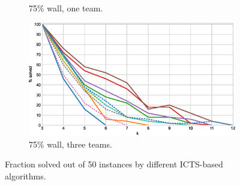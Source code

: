 \documentclass[english]{article}
\newcommand\graphwidth{0.49\textwidth}
\begin{document}
\begin{figure}[t]
\begin{subfigure}{\graphwidth}
			\caption{75\% wall, one team.}
			\label{fig:i-75-1-p}
		\end{subfigure}
		\begin{subfigure}{\graphwidth}
			\centering
			\includegraphics[width=\linewidth]{img/results/icts-comparison/75-3-p}
			\caption{75\% wall, three teams.}
			\label{fig:i-75-3-p}
		\end{subfigure}
		\caption{Fraction solved out of 50 instances by different ICTS-based algorithms.}
		\label{fig:i-probs}
	\end{figure}
\end{document}
